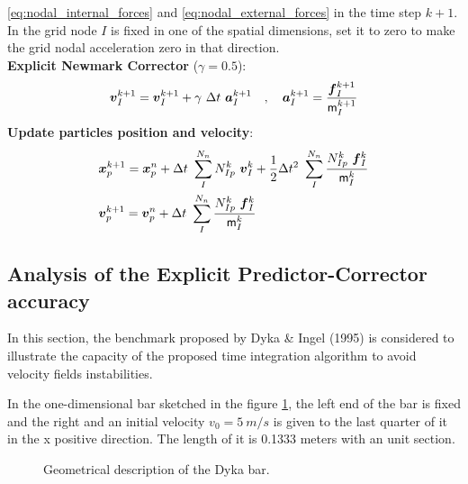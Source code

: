 \begin{algorithm}
\begin{algorithmic}[1]
    \eqref{eq:nodal_internal_forces} and \eqref{eq:nodal_external_forces} in the time step $k+1$. In the
    grid node $I$ is fixed in one of the spatial dimensions, set it to
    zero to make the grid nodal acceleration zero in that direction.\\
    \STATE \textbf{Explicit Newmark Corrector} ($\gamma = 0.5$):
    \begin{equation*}
      \vec{v}_{I}^{k+1} = \vec{v}_{I}^{k+1} + \gamma\ \Delta t\
      \vec{a}_I^{k+1} \quad , \quad  \vec{a}_I^{k+1} = \frac{\vec{f}_{I}^{k+1}}{\tens{m}_I^{k+1}}  
    \end{equation*}
    \STATE \textbf{Update particles position and velocity}:
    \begin{align*}
      &\vec{x}_p^{k+1} = \vec{x}_p^n + \Delta t\
        \sum^{N_n}_{I} N_{Ip}^k\ \vec{v}_{I}^{k} +
        \frac{1}{2}\Delta t^2\ \sum^{N_n}_{I}\frac{N_{Ip}^k\
        \vec{f}_{I}^{k}}{\tens{m}_I^k}\\
      &\vec{v}_p^{k+1} = \vec{v}_p^n + \Delta t\
        \sum^{N_n}_{I}\frac{N_{Ip}^k\
        \vec{f}_{I}^{k}}{\tens{m}_I^k}
    \end{align*}
  \end{algorithmic}
\end{algorithm} 

\subsection{Analysis of the Explicit Predictor-Corrector accuracy}
\label{sec:EPC-accuracy}

In this section, the benchmark proposed by Dyka \& Ingel
(1995)\cite{Dyka1995} is considered to illustrate the
capacity of the proposed time integration algorithm to avoid velocity
fields instabilities.

In the one-dimensional bar sketched in the figure \ref{fig:Dyka_Bar},
the left end of the bar is fixed and the right and an initial velocity
$v_0 = 5\ m/s$ is given to the last quarter of it in the x positive
direction. The length of it is 0.1333 meters with an unit section.

\begin{figure}\sidecaption
  \centering
  \resizebox{\hsize}{!}{
    }
  \caption{Geometrical description of the Dyka \cite{Dyka1995} bar.}
  \label{fig:Dyka_Bar}
\end{figure}

